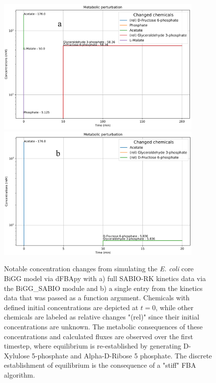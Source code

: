 \begin{figure}
    \centering
    \includegraphics[width = 0.9\textwidth]{images/WCMpy/SABIO_dfba.png} \\
    \includegraphics[width = 0.9\textwidth]{images/WCMpy/simple_argument.png}
    \caption{
        Notable concentration changes from simulating the \textit{E. coli} core BiGG model via dFBApy with a) full SABIO-RK kinetics data via the BiGG\_SABIO module and b) a single entry from the kinetics data that was passed as a function argument. Chemicals with defined initial concentrations are depicted at $t=0$, while other chemicals are labeled as relative changes "(rel)" since their initial concentrations are unknown. The metabolic consequences of these concentrations and calculated fluxes are observed over the first timestep, where equilibrium is re-established by generating D-Xylulose 5-phosphate and Alpha-D-Ribose 5 phosphate. The discrete establishment of equilibrium is the consequence of a "stiff" FBA algorithm. 
    }
    \label{dfba}
\end{figure}

